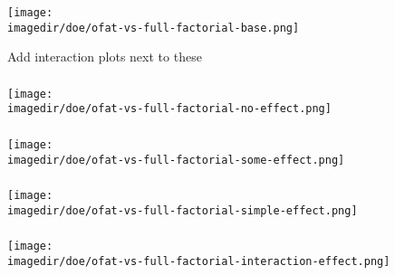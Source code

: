 \documentclass[11pt,aspectratio=169,mathserif]{beamer}
\begin{document}
\iffalse
\begin{frame}\frametitle{}
	\centerline{\texttt{[image: \\imagedir/doe/ofat-vs-full-factorial-base.png]}}
	Add interaction plots next to these
\end{frame}
\begin{frame}\frametitle{}
	\centerline{\texttt{[image: \\imagedir/doe/ofat-vs-full-factorial-no-effect.png]}}
\end{frame}
\begin{frame}\frametitle{}
	\centerline{\texttt{[image: \\imagedir/doe/ofat-vs-full-factorial-some-effect.png]}}
\end{frame}
\begin{frame}\frametitle{}
	\centerline{\texttt{[image: \\imagedir/doe/ofat-vs-full-factorial-simple-effect.png]}}
\end{frame}
\begin{frame}\frametitle{}
	\centerline{\texttt{[image: \\imagedir/doe/ofat-vs-full-factorial-interaction-effect.png]}}
\end{frame}
\end{document}
